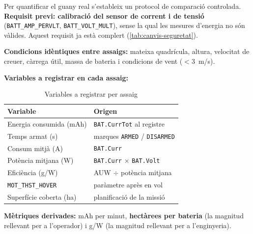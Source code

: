Per quantificar el guany real s'estableix un protocol de comparació controlada. \textbf{Requisit previ: calibració del sensor de corrent i de tensió} (\texttt{BATT\_AMP\_PERVLT}, \texttt{BATT\_VOLT\_MULT}), sense la qual les mesures d'energia no són vàlides. Aquest requisit ja està complert (\cref{tab:canvis-seguretat}).

\textbf{Condicions idèntiques entre assaigs:} mateixa quadrícula, altura, velocitat de creuer, càrrega útil, massa de bateria i condicions de vent ($< 3$~m/s).

\textbf{Variables a registrar en cada assaig:}

\begin{table}[H]
    \centering
    \caption{Variables a registrar per assaig}
    \label{tab:variables-mesura}
    \begin{tabular}{ll}
        \toprule
        Variable & Origen \\
        \midrule
        Energia consumida (mAh) & \texttt{BAT.CurrTot} al registre \\
        Temps armat (s) & marques \texttt{ARMED} / \texttt{DISARMED} \\
        Consum mitjà (A) & \texttt{BAT.Curr} \\
        Potència mitjana (W) & \texttt{BAT.Curr} $\times$ \texttt{BAT.Volt} \\
        Eficiència (g/W) & AUW $\div$ potència mitjana \\
        \texttt{MOT\_THST\_HOVER} & paràmetre après en vol \\
        Superfície coberta (ha) & planificació de la missió \\
        \bottomrule
    \end{tabular}
\end{table}

\textbf{Mètriques derivades:} mAh per minut, \textbf{hectàrees per bateria} (la magnitud rellevant per a l'operador) i g/W (la magnitud rellevant per a l'enginyeria).

